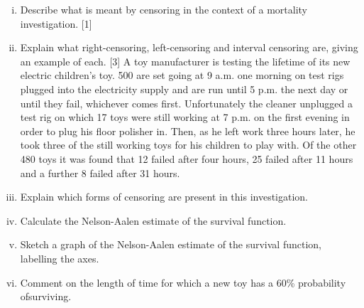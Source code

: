 \documentclass[a4paper,12pt]{article}
\begin{document}
\begin{enumerate}[(i)]
(i)
(ii)
\item Describe what is meant by censoring in the context of a mortality
investigation.
[1]
\item Explain what right-censoring, left-censoring and interval censoring are, giving an example of each.
[3]
\medskip A toy manufacturer is testing the lifetime of its new electric children’s toy. 500 are set going at 9 a.m. one morning on test rigs plugged into the electricity supply and are run until 5 p.m. the next day or until they fail, whichever comes first. Unfortunately the cleaner unplugged a test rig on which 17 toys were still working at 7 p.m. on the
first evening in order to plug his floor polisher in. Then, as he left work three hours later, he took three of the still working toys for his children to play with. Of the other 480 toys it was found that 12 failed after four hours, 25 failed after 11 hours and a further 8 failed after 31 hours.
\item Explain which forms of censoring are present in this investigation. 
\item Calculate the Nelson-Aalen estimate of the survival function. 
\item Sketch a graph of the Nelson-Aalen estimate of the survival function, labelling the axes.

\item  Comment on the length of time for which a new toy has a 60\% probability ofsurviving.
\end{enumerate}

\newapge
\end{document}
